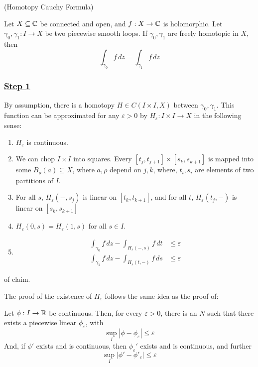 \documentclass[x11names,reqno,14pt]{extarticle}
\begin{document}
\thm (Homotopy Cauchy Formula)

Let $X \subseteq\mathbb{C}$ be connected and open, and $f:X\to\mathbb{C}$ is holomorphic. Let $\gamma_0, \gamma_1:I\to X$ be two piecewise smooth loops. If $\gamma_0, \gamma_1$ are freely homotopic in $X$, then
\[
\int_{\gamma_0}f\,dz = \int_{\gamma_1}f\,dz
\]

\proof

\subsubsection*{\underline{Step 1}}

\claim

By assumption, there is a homotopy $H\in C(I\times I, X)$ between $\gamma_0, \gamma_1$. This function can be approximated for any $\varepsilon>0$ by $H_{\varepsilon}:I\times I \to X$ in the following sense: 

\begin{enumerate}
\item $H_\varepsilon$ is continuous. 
\item We can chop $I\times I$ into squares. Every $[t_j, t_{j + 1}]\times[s_k, s_{k + 1}]$ is mapped into some $B_{\rho}(a) \subseteq X$, where $a, \rho$ depend on $j, k$, where, $t_i, s_i$ are elements of two partitions of $I$. 
\item For all $s$, $H_{\varepsilon}(-, s_j)$ is linear on $[t_k, t_{k + 1}]$, and for all $t$, $H_\varepsilon(t_j, -)$ is linear on $[s_k, s_{k + 1}]$
\item $H_\varepsilon(0, s) = H_\varepsilon(1, s)$ for all $s \in I$. 
\item 
\begin{align*}
\int_{\gamma_0}f\,dz - \int_{H_\varepsilon(-, s)}f\,dt & \leq \varepsilon \\
\int_{\gamma_1}f\,dz - \int_{H_\varepsilon(t, -)}f\,ds & \leq \varepsilon
\end{align*}
\end{enumerate}

\proof of claim. 

The proof of the existence of $H_\varepsilon$ follows the same idea as the proof of: 

\claim

Let $\phi:I\to\mathbb{R}$ be continuous. Then, for every $\varepsilon>0$, there is an $N$ such that there exists a piecewise linear $\phi_\varepsilon$, with 
\[
\sup_I|\phi - \phi_\varepsilon|\leq\varepsilon
\]
And, if $\phi'$ exists and is continuous, then $\phi_\varepsilon'$ exists and is continuous, and further 
\[
\sup_I|\phi' - \phi'_\varepsilon|\leq \varepsilon
\]
\end{document}
